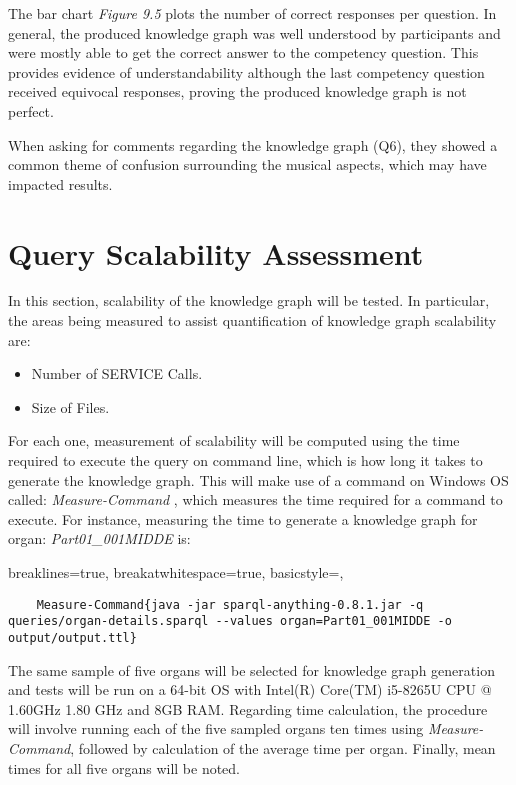 The bar chart \textit{Figure 9.5} plots the number of correct responses per question. In general, the produced knowledge graph was well understood by participants and were mostly able to get the correct answer to the competency question. This provides evidence of understandability although the last competency question received equivocal responses, proving the produced knowledge graph is not perfect. 

When asking for comments regarding the knowledge graph (Q6), they showed a common theme of confusion surrounding the musical aspects, which may have impacted results. 

\section{Query Scalability Assessment}
In this section, scalability of the knowledge graph will be tested. In particular, the areas being measured to assist quantification of knowledge graph scalability are: 

\vspace{-0.1cm}
\begin{itemize}
\itemsep0cm
    \item Number of SERVICE Calls.
    \vspace{-0.1cm}
    \item Size of Files.
\end{itemize}
\vspace{-0.1cm}

For each one, measurement of scalability will be computed using the time required to execute the query on command line, which is how long it takes to generate the knowledge graph. This will make use of a command on Windows OS called: \textit{Measure-Command} \cite{measurecommand}, which measures the time required for a command to execute. For instance, measuring the time to generate a knowledge graph for organ: \textit{Part01\_001MIDDE} is:

\lstset
{
    breaklines=true,
    breakatwhitespace=true,
    basicstyle=\linespread{1.5}\ttfamily,
}
\begin{lstlisting}
    Measure-Command{java -jar sparql-anything-0.8.1.jar -q queries/organ-details.sparql --values organ=Part01_001MIDDE -o output/output.ttl}
\end{lstlisting}

The same sample of five organs will be selected for knowledge graph generation and tests will be run on a 64-bit OS with Intel(R) Core(TM) i5-8265U CPU @ 1.60GHz 1.80 GHz and 8GB RAM. Regarding time calculation, the procedure will involve running each of the five sampled organs ten times using \textit{Measure-Command}, followed by calculation of the average time per organ. Finally, mean times for all five organs will be noted.

